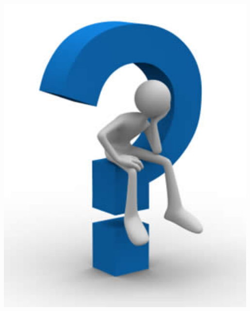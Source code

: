 \begin{frame}
\begin{columns}[c]
\begin{column}{0.33\textwidth}
\begin{center}
                \includegraphics[width=0.99\textwidth]{jpg/question-blue.jpg}
            \end{center}
        \end{column}
    \end{columns}
    \begin{columns}[t]
        \begin{column}{0.33\textwidth}
            \begin{center}
            \end{center}
        \end{column}
        \begin{column}{0.33\textwidth}
            \begin{center}
            \end{center}
        \end{column}
        \begin{column}{0.33\textwidth}
            \begin{center}
            \end{center}
        \end{column}
    \end{columns}
\end{frame}

